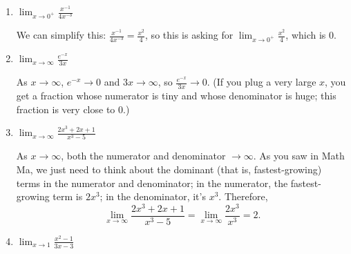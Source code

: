 \documentclass{article}
\begin{document}
\begin{enumerate}
\begin{enumerate}
\begin{enumerate}
      \item \label{lhopital-prep-old-limits-inf/inf-1}
        \begin{problem}[\vfill]
          $\displaystyle \lim_{x\to 0^+} \frac{x^{-1}}{4x^{-3}}$
        \end{problem}

        \begin{solution}
          We can simplify this: $\displaystyle \frac{x^{-1}}{4x^{-3}} =
          \frac{x^2}{4}$, so this is asking for $\displaystyle \lim_{x \to
            0^+} \frac{x^2}{4}$, which is $\boxed{0}$.
        \end{solution}

      \item \label{lhopital-prep-old-limits-not-indet-1}
        \begin{problem}[\vfill]
          $\displaystyle \lim_{x\to \infty} \frac{e^{-x}}{3x}$
        \end{problem}

        \begin{solution}
          As $x \to \infty$, $e^{-x} \to 0$ and $3x \to \infty$, so
          $\frac{e^{-x}}{3x} \to \boxed{0}$.  (If you plug a very large
          $x$, you get a fraction whose numerator is tiny and whose
          denominator is huge; this fraction is very close to 0.) 
        \end{solution}

      \item \label{lhopital-prep-old-limits-inf/inf-2}
        \begin{problem}[\vfill\newpage]
          $\displaystyle \lim_{x\to \infty} \frac{2x^3+2x+1}{x^3 -5}$
        \end{problem}

        \begin{solution}
          As $x \to \infty$, both the numerator and denominator $\to
          \infty$.  As you saw in Math Ma, we just need to think about the
          dominant (that is, fastest-growing) terms in the numerator and
          denominator; in the numerator, the fastest-growing term is
          $2x^3$; in the denominator, it's $x^3$.  Therefore,
          \[ \lim_{x\to \infty} \frac{2x^3+2x+1}{x^3 -5} = \lim_{x \to
            \infty} \frac{2 x^3}{x^3} = \boxed{2}.\]
        \end{solution}

      \item \label{lhopital-prep-old-limits-0/0-2}
        \begin{problem}[\vfill]
          $\displaystyle \lim_{x\to 1} \frac{x^2-1}{3x-3}$
        \end{problem}


\end{enumerate}
\end{enumerate}
\end{enumerate}
\end{document}
